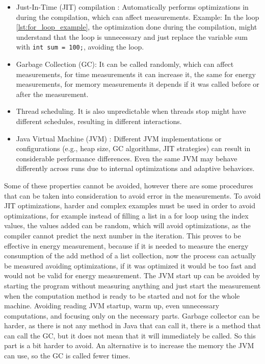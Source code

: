 \begin{itemize}
    \item Just-In-Time (JIT) compilation : Automatically performs optimizations in during the compilation, which can affect measurements. Example: In the loop \ref{lst:for_loop_example}, the optimization done during the compilation, might understand that the loop is unnecessary and just replace the variable sum with \texttt{int sum = 100;}, avoiding the loop.
    \item Garbage Collection (GC): It can be called randomly, which can affect measurements, for time measurements it can increase it, the same for energy measurements, for memory measurements it depends if it was called before or after the measurement.
    \item Thread scheduling. It is also unpredictable when threads stop might have different schedules, resulting in different interactions.
    \item Java Virtual Machine (JVM) : Different JVM implementations or configurations (e.g., heap size, GC algorithms, JIT strategies) can result in considerable performance differences. Even the same JVM may behave differently across runs due to internal optimizations and adaptive behaviors.
\end{itemize}

Some of these properties cannot be avoided, however there are some procedures that can be taken into consideration to avoid error in the measurements.
To avoid JIT optimizations, harder and complex examples must be used in order to avoid optimizations, for example instead of filling a list in a for loop using the index values, the values added can be random, which will avoid optimizations, as the compiler cannot predict the next number in the iteration. This proves to be effective in energy measurement, because if it is needed to measure the energy consumption of the add method of a list collection, now the process can actually be measured avoiding optimizations, if it was optimized it would be too fast and would not be valid for energy measurement.
The JVM start up can be avoided by starting the program without measuring anything and just start the measurement when the computation method is ready to be started and not for the whole machine. Avoiding reading JVM startup, warm up, even unnecessary computations, and focusing only on the necessary parts.
Garbage collector can be harder, as there is not any method in Java that can call it, there is a method that can call the GC, but it does not mean that it will immediately be called. So this part is a bit harder to avoid. An alternative is to increase the memory the JVM can use, so the GC is called fewer times. 

